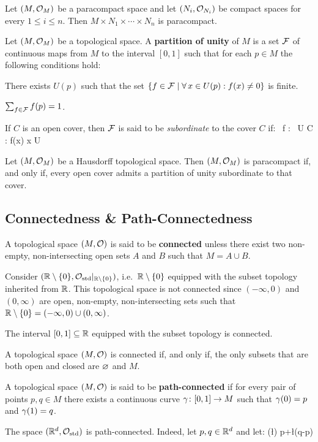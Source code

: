 \bt[]
Let $(M,\mathcal{O}_M)$ be a paracompact space and let $(N_i,\mathcal{O}_{N_i})$ be compact spaces for every $1\leq i \leq n$. Then
$M\times N_1\times\cdots\times N_n$ is paracompact.
\et

Let $(M,\mathcal{O}_M)$ be a topological space. A \textbf{partition of unity} of $M$ is a set $\mathcal{F}$ of continuous maps from
$M$ to the interval $[0,1]$ such that for each $p\in M$ the following conditions hold:
\ben
\item[i)] There exists $U(p)$ such that the set $\{f \in \mathcal{F} \mid \forall \, x \in U(p):f(x)\neq 0\}$ is finite.
\item[ii)] $\sum_{f\in \mathcal{F}}f(p)=1$.
\een

If $C$ is an open cover, then $\mathcal{F}$ is said to be \emph{subordinate} to the cover $C$ if:
\bse
\forall \, f \in \cF : \exists \, U \in C : f(x)  \imp x \in U
\ese
\ed

\bt[]
Let $(M,\mathcal{O}_M)$ be a Hausdorff topological space. Then $(M,\mathcal{O}_M)$ is paracompact if, and only if, every open cover
admits a partition of unity subordinate to that cover.
\et

\subsection{Connectedness \& Path-Connectedness}

A topological space $(M,\mathcal{O})$ is said to be \textbf{connected} unless there exist two non-empty, non-intersecting
open sets $A$ and $B$ such that $M=A\cup B$.
\ed

\be
Consider $(\mathbb{R}\setminus \{0\},\mathcal{O}_\mathrm{std}|_{\mathbb{R}\setminus\{0\}})$, i.e.\ $\mathbb{R}\setminus\{0\}$ equipped with the subset topology
inherited from $\mathbb{R}$. This topological space is not connected since $ (-\infty,0)$ and $(0,\infty)$ are open,
non-empty, non-intersecting sets such that $\mathbb{R}\setminus\{0\}=(-\infty,0) \cup (0, \infty)$.
\ee

\bt[]
The interval $[0,1]\subseteq\mathbb{R}$ equipped with the subset topology is connected.
\et

\bt[]
A topological space $(M,\mathcal{O})$ is connected if, and only if, the only subsets that are both open and closed are $\varnothing$
and $M$.
\et

A topological space $(M,\mathcal{O})$ is said to be \textbf{path-connected} if for every pair of points $p,q\in M$ there
exists a continuous curve $\gamma\colon[0,1]\to M$ such that $\gamma(0)=p$ and $\gamma(1)=q$.
\ed

\be
The space $(\mathbb{R}^d,\mathcal{O}_\mathrm{std})$ is path-connected. Indeed, let $p,q\in\mathbb{R}^d$ and let:
\bse
\g(\l) \coloneqq p+\l(q-p)
\ese

